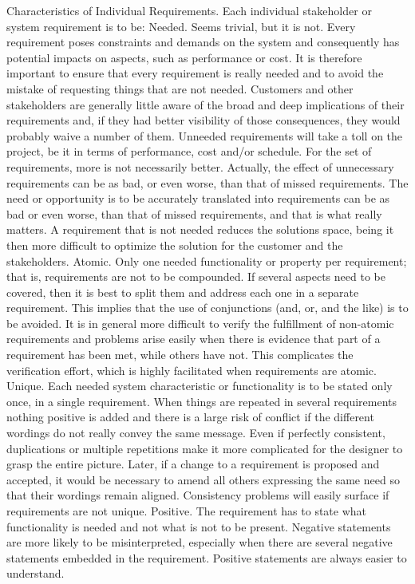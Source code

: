 Characteristics of Individual Requirements. Each individual stakeholder or system requirement is to be:
Needed. Seems trivial, but it is not. Every requirement poses constraints and demands on the system and consequently has potential impacts on aspects, such as performance or cost. It is therefore important to ensure that every requirement is really needed and to avoid the mistake of requesting things that are not needed. Customers and other stakeholders are generally little aware of the broad and deep implications of their requirements and, if they had better visibility of those consequences, they would probably waive a number of them. Unneeded requirements will take a toll on the project, be it in terms of performance, cost and/or schedule. For the set of requirements, more is not necessarily better. Actually, the effect of unnecessary requirements can be as bad, or even worse, than that of missed requirements. The need or opportunity is to be accurately translated into requirements can be as bad or even worse, than that of missed requirements, and that is what really matters. A requirement that is not needed reduces the solutions space, being it then more difficult to optimize the solution for the customer and the stakeholders.
Atomic. Only one needed functionality or property per requirement; that is, requirements are not to be compounded. If several aspects need to be covered, then it is best to split them and address each one in a separate requirement. This implies that the use of conjunctions (and, or, and the like) is to be avoided. It is in general more difficult to verify the fulfillment of non-atomic requirements and problems arise easily when there is evidence that part of a requirement has been met, while others have not. This complicates the verification effort, which is highly facilitated when requirements are atomic.
Unique. Each needed system characteristic or functionality is to be stated only once, in a single requirement. When things are repeated in several requirements nothing positive is added and there is a large risk of conflict if the different wordings do not really convey the same message. Even if perfectly consistent, duplications or multiple repetitions make it more complicated for the designer to grasp the entire picture. Later, if a change to a requirement is proposed and accepted, it would be necessary to amend all others expressing the same need so that their wordings remain aligned. Consistency problems will easily surface if requirements are not unique.
Positive. The requirement has to state what functionality is needed and not what is not to be present. Negative statements are more likely to be misinterpreted, especially when there are several negative statements embedded in the requirement. Positive statements are always easier to understand.
